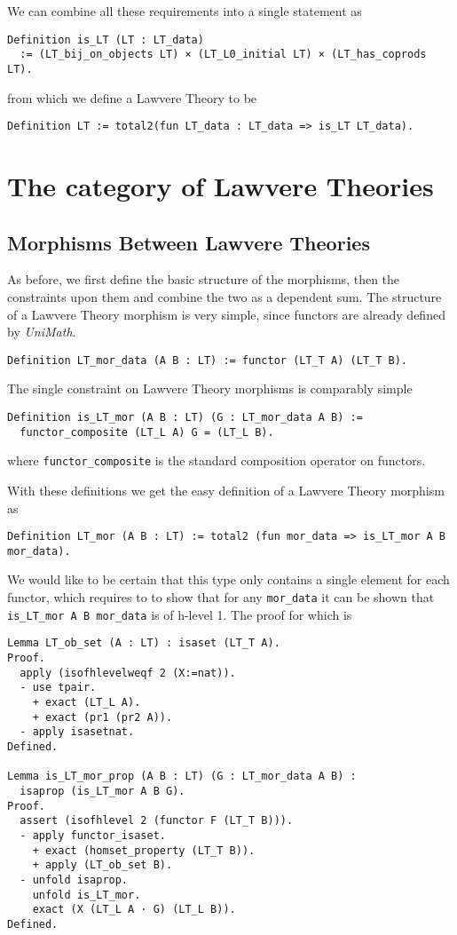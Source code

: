 We can combine all these requirements into a single statement as
\begin{lstlisting}
Definition is_LT (LT : LT_data)
  := (LT_bij_on_objects LT) × (LT_L0_initial LT) × (LT_has_coprods LT).
\end{lstlisting}
from which we define a Lawvere Theory to be
\begin{lstlisting}
Definition LT := total2(fun LT_data : LT_data => is_LT LT_data).
\end{lstlisting}

\section{The category of Lawvere Theories}
\subsection{Morphisms Between Lawvere Theories}
As before, we first define the basic structure of the morphisms, then the
constraints upon them and combine the two as a dependent sum. The structure of a
Lawvere Theory morphism is very simple, since functors are already defined by
\textit{UniMath}.
\begin{lstlisting}
Definition LT_mor_data (A B : LT) := functor (LT_T A) (LT_T B).
\end{lstlisting}

The single constraint on Lawvere Theory morphisms is comparably simple
\begin{lstlisting}
Definition is_LT_mor (A B : LT) (G : LT_mor_data A B) := 
  functor_composite (LT_L A) G = (LT_L B).
\end{lstlisting}
where \lstinline|functor_composite| is the standard composition operator on functors.

With these definitions we get the easy definition of a Lawvere Theory morphism
as
\begin{lstlisting}
Definition LT_mor (A B : LT) := total2 (fun mor_data => is_LT_mor A B mor_data).
\end{lstlisting}

We would like to be certain that this type only contains a single element for
each functor, which requires to to show that for any \lstinline|mor_data| it can be
shown that \lstinline|is_LT_mor A B mor_data| is of h-level 1. The proof for which is
\begin{lstlisting}
Lemma LT_ob_set (A : LT) : isaset (LT_T A).
Proof.
  apply (isofhlevelweqf 2 (X:=nat)).
  - use tpair.
    + exact (LT_L A).
    + exact (pr1 (pr2 A)).
  - apply isasetnat.
Defined.

Lemma is_LT_mor_prop (A B : LT) (G : LT_mor_data A B) : 
  isaprop (is_LT_mor A B G).
Proof.
  assert (isofhlevel 2 (functor F (LT_T B))).
  - apply functor_isaset.
    + exact (homset_property (LT_T B)).
    + apply (LT_ob_set B).
  - unfold isaprop.
    unfold is_LT_mor.
    exact (X (LT_L A · G) (LT_L B)).
Defined.
\end{lstlisting}

